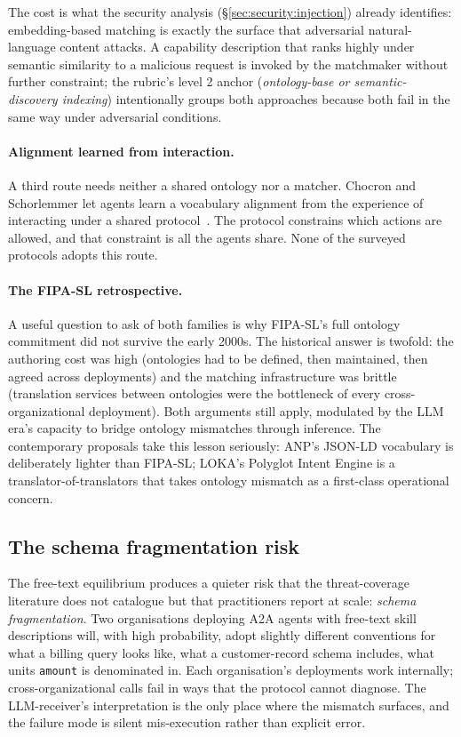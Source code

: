 The cost is what the security analysis
(\S\ref{sec:security:injection}) already identifies:
embedding-based matching is exactly the surface that
adversarial natural-language content attacks. A
capability description that ranks highly under semantic
similarity to a malicious request is invoked by the
matchmaker without further constraint; the rubric's level
2 anchor (\emph{ontology-base or semantic-discovery indexing})
intentionally groups both approaches because both fail in
the same way under adversarial conditions.

\paragraph{Alignment learned from interaction.}
A third route needs neither a shared ontology nor a matcher.
Chocron and Schorlemmer let agents learn a vocabulary
alignment from the experience of interacting under a shared
protocol~\cite{chocron2020vocabulary}. The protocol
constrains which actions are allowed, and that constraint is
all the agents share. None of the surveyed protocols adopts
this route.

\paragraph{The FIPA-SL retrospective.}
A useful question to ask of both families is why FIPA-SL's
full ontology commitment did not survive the early 2000s.
The historical answer is twofold: the authoring cost was
high (ontologies had to be defined, then maintained, then
agreed across deployments) and the matching infrastructure
was brittle (translation services between ontologies were
the bottleneck of every cross-organizational deployment).
Both arguments still apply, modulated by the LLM era's
capacity to bridge ontology mismatches through inference.
The contemporary proposals take this lesson seriously: ANP's
JSON-LD vocabulary is deliberately lighter than FIPA-SL;
LOKA's Polyglot Intent Engine is a translator-of-translators
that takes ontology mismatch as a first-class operational
concern.

\subsection{The schema fragmentation risk}
\label{sec:semantic:fragmentation}

The free-text equilibrium produces a quieter risk that the
threat-coverage literature does not catalogue but that
practitioners report at scale: \emph{schema fragmentation}.
Two organisations deploying A2A agents with
free-text skill descriptions will, with high probability,
adopt slightly different conventions for what a billing
query looks like, what a customer-record schema includes,
what units \texttt{amount} is denominated in. Each
organisation's deployments work internally; cross-organizational
calls fail in ways that the protocol cannot diagnose. The
LLM-receiver's interpretation is the only place where the
mismatch surfaces, and the failure mode is silent
mis-execution rather than explicit error.

